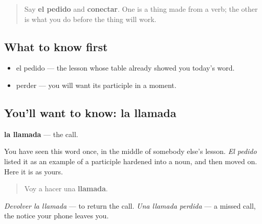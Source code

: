 \label{lesson:ES-C469-llamada}



\begin{quote}
Say \textbf{el pedido} and \textbf{conectar}. One is a thing made from a verb; the other is what you do before the thing will work.
\end{quote}

\subsection*{What to know first}
\begin{itemize}
\raggedright
  \item el pedido — the lesson whose table already showed you today's word.
  \item perder — you will want its participle in a moment.
\end{itemize}

\subsection*{You'll want to know: la llamada}
\textbf{la llamada} — the call.

You have seen this word once, in the middle of somebody else's lesson. \emph{El pedido} listed it as an example of a participle hardened into a noun, and then moved on. Here it is as yours.

\begin{quote}
Voy a hacer una \textbf{llamada}.
\end{quote}

\emph{Devolver la llamada} — to return the call. \emph{Una llamada perdida} — a missed call, the notice your phone leaves you.

